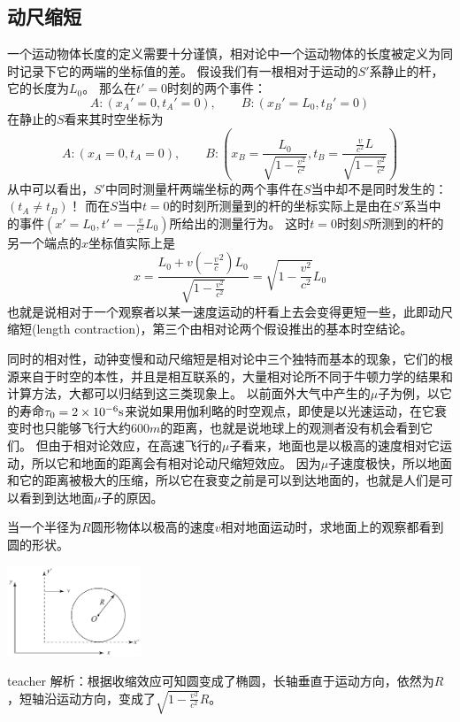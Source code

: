 \subsection{动尺缩短}
一个运动物体长度的定义需要十分谨慎，相对论中一个运动物体的长度被定义为{\heiti 同时}记录下它的两端的坐标值的差。
假设我们有一根相对于运动的$S'$系静止的杆，它的长度为$L_0$。
那么在$t'=0$时刻的两个事件：
\begin{equation*}
A:(x_A'=0,t_A'=0),\qquad B:(x_B'=L_0,t_B'=0)
\end{equation*}
在静止的$S$看来其时空坐标为
\begin{equation*}
A:(x_A=0,t_A=0),\qquad B:(x_B=\frac{L_0}{\sqrt{1-\frac{v^2}{c^2}}},t_B=\frac{\frac{v}{c^2}L}{\sqrt{1-\frac{v^2}{c^2}}})
\end{equation*}
从中可以看出，$S'$中同时测量杆两端坐标的两个事件在$S$当中却不是同时发生的：$(t_A\neq t_B)$！
而在$S$当中$t=0$的时刻所测量到的杆的坐标实际上是由在$S'$系当中的事件$(x'=L_0,t'=-\frac{v}{c^2}L_0)$所给出的测量行为。
这时$t=0$时刻$S$所测到的杆的另一个端点的$x$坐标值实际上是
\begin{equation}
x=\frac{L_0+v(-\frac{v}{c}^2)L_0}{\sqrt{1-\frac{v^2}{c^2}}}=\sqrt{1-\frac{v^2}{c^2}}L_0
\end{equation}
也就是说相对于一个观察者以某一速度运动的杆看上去会变得更短一些，此即{\heiti 动尺缩短}(length contraction)，第三个由相对论两个假设推出的基本时空结论。

同时的相对性，动钟变慢和动尺缩短是相对论中三个独特而基本的现象，它们的根源来自于时空的本性，并且是相互联系的，大量相对论所不同于牛顿力学的结果和计算方法，大都可以归结到这三类现象上。
以前面外大气中产生的$\mu$子为例，以它的寿命$\tau_0=2\times 10^{-6}{\rm{s}}$来说如果用伽利略的时空观点，即使是以光速运动，在它衰变时也只能够飞行大约$600\unit{m}$的距离，也就是说地球上的观测者没有机会看到它们。
但由于相对论效应，在高速飞行的$\mu$子看来，地面也是以极高的速度相对它运动，所以它和地面的距离会有相对论动尺缩短效应。
因为$\mu$子速度极快，所以地面和它的距离被极大的压缩，所以它在衰变之前是可以到达地面的，也就是人们是可以看到到达地面$\mu$子的原因。


\begin{example}

当一个半径为$R$圆形物体以极高的速度$v$相对地面运动时，求地面上的观察都看到圆的形状。

\begin{flushright}
\includegraphics[width = 0.3\textwidth]{images/relativity-8.pdf} 
\end{flushright}
\begin{taggedblock}{teacher}
\noindent
解析：根据收缩效应可知圆变成了椭圆，长轴垂直于运动方向，依然为$R$，短轴沿运动方向，变成了$\sqrt{1-\frac{v^2}{c^2}}R$。
\end{taggedblock}
\end{example}



